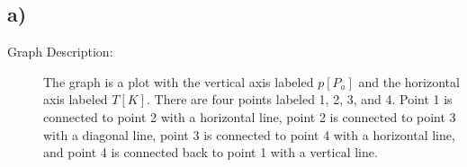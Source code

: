 

\subsection*{a)}

\begin{description}
    \item[Graph Description:] The graph is a plot with the vertical axis labeled \( p [P_a] \) and the horizontal axis labeled \( T [K] \). There are four points labeled 1, 2, 3, and 4. Point 1 is connected to point 2 with a horizontal line, point 2 is connected to point 3 with a diagonal line, point 3 is connected to point 4 with a horizontal line, and point 4 is connected back to point 1 with a vertical line.
\end{description}